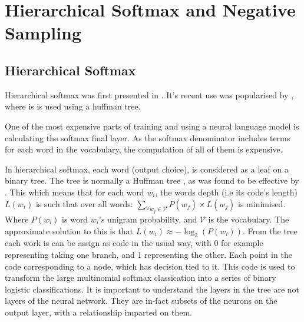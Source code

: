 \documentclass[parskip]{komatufte}
\begin{document}
\section{Hierarchical Softmax and Negative Sampling}\label{sec:hierachical-softmax-and-negative-sampling}

\subsection{Hierarchical Softmax}
Hierarchical softmax was first presented in  .
It's recent use was popularised by , where is is used using a huffman tree.




One of the most expensive parts of training and using a neural language model is calculating the softmax final layer.
As the softmax denominator includes terms for each word in the vocabulary, the computation of all of them is expensive.

In hierarchical softmax, each word (output choice), is considered as a leaf on a binary tree.
The tree is normally a Huffman tree , as was found to be effective by .
This which means that for each word $w_i$, the words depth (i.e its code's length) $L(w_i)$ is such that over all words: $\sum_{\forall w_j \in \mathcal{V}} P(w_j)\times L(w_j)$ is minimised.
Where $P(w_i)$ is word $w_i$'s unigram probability, and $\mathcal{V}$ is the vocabulary.
The approximate solution to this is that $L(w_i) \approx -\log_2(P(w_i))$.
From the tree each work is can be assign as code in the usual way, with 0 for example representing taking one branch, and 1 representing the other.
Each point in the code corresponding to a node, which has decision tied to it.
This code is used to transform the large  multinomial softmax classication into a series of binary logistic classifications.
It is important to understand the layers in the tree are not layers of the neural network.
They are in-fact subsets of the neurons on the output layer, with a relationship imparted on them.
\end{document}
